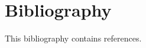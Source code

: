 \documentclass[12pt]{cmuthesis}
\begin{document}

% 
% 
% 
% 
% 
% 
% 
% 
% 




% 
% 

% 
% 
% 

% 

\chapter*{Bibliography}

\vspace{-25mm}
This bibliography contains  references.
\vspace{10mm}

\printbibliography[heading=none]
\end{document}
